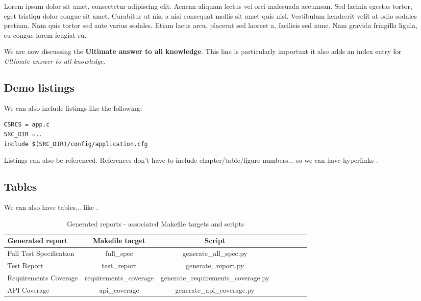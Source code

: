 Lorem ipsum dolor sit amet, consectetur adipiscing elit. Aenean aliquam lectus vel orci malesuada accumsan. Sed lacinia egestas tortor, eget tristiqu dolor congue sit amet. Curabitur ut nisl a nisi consequat mollis sit amet quis nisl. Vestibulum hendrerit velit at odio sodales pretium. Nam quis tortor sed ante varius sodales. Etiam lacus arcu, placerat sed laoreet a, facilisis sed nunc. Nam gravida fringilla ligula, eu congue lorem feugiat eu.

We are now discussing the \textbf{Ultimate answer to all knowledge}.
This line is particularly important it also adds an index entry for \textit{Ultimate answer to all knowledge}.

\subsection{Demo listings}

We can also include listings like the following:

\lstset{language=make,caption=Application Makefile,label=lst:app-make}
\begin{lstlisting}
CSRCS = app.c
SRC_DIR =..
include $(SRC_DIR)/config/application.cfg
\end{lstlisting}

Listings can also be referenced. References don't have to include chapter/table/figure numbers... so we can have hyperlinks .

\subsection{Tables}

We can also have tables... like .

\begin{center}
\begin{table}[htb]
  \caption{Generated reports - associated Makefile targets and scripts}
  \begin{tabular}{l*{6}{c}r}
    Generated report & Makefile target & Script \\
    \hline
    Full Test Specification & full_spec & generate_all_spec.py  \\
    Test Report & test_report & generate_report.py  \\
    Requirements Coverage & requirements_coverage &
    generate_requirements_coverage.py   \\
    API Coverage & api_coverage & generate_api_coverage.py  \\
  \end{tabular}
  \label{table:reports}
\end{table}
\end{center}
